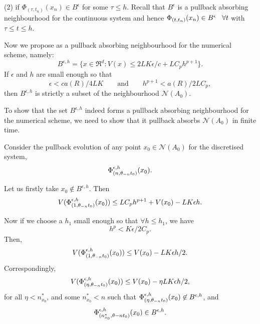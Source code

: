 \begin{prf}
  (2) if $\Phi_{(\tau,t_n)}(x_n) \in B^{\epsilon}$ for some $\tau
  \leq h$. Recall that $B^{\epsilon}$ is a pullback absorbing
  neighbourhood for the continuous system and hence $\Phi_{(t,t_{n})}(x_{n})
  \in B^{\epsilon} \hspace{3mm} \forall t$ with $\tau \leq t \leq h$.

  Now we propose as a pullback absorbing neighbourhood for the numerical
  scheme, namely:
  \[ B^{\epsilon,h} = \{x \in \Re^{d} : V(x) \leq 2LK \epsilon /c +
                    LC_{p}h^{p+1} \}. \]
  If $\epsilon$ and $h$ are small enough so that
  \begin{equation}\label{ehlimitseq}
    \epsilon < c a(R) / 4LK \qquad \text{and} \qquad  h^{p+1}  <  a(R) / 2LC_p,
  \end{equation}
  then $B^{\epsilon,h}$ is strictly a subset of the neighbourhood
  $\mathcal{N}(A_0)$.

  To show that the set $B^{\epsilon,h}$ indeed forms a pullback absorbing
  neighbourhood for the numerical scheme, we need to show that
  it pullback absorbs $\mathcal{N}(A_0)$ in finite time.

  Consider the pullback evolution of any point $x_{0} \in \mathcal{N}(A_0)$
  for the discretised system,
  \[ \Phi^{\epsilon,h}_{(n,\theta_{-n}t_0)}(x_0). \]

  Let us firstly take $x_{0} \not \in B^{\epsilon,h}$. Then
  \[ V(\Phi^{\epsilon,h}_{(1,\theta_{-n}t_0)}(x_0)) \leq LC_{p}h^{p+1} +  V(x_0) - LK
              \epsilon h. \]

  Now if we choose a $h_{1}$ small enough so that $\forall h \leq h_1$,
  we have
  \begin{equation}\label{hlimiteq}
  h^{p} < K\epsilon/2C_{p}.
  \end{equation}
  Then,
  \[ V(\Phi^{\epsilon,h}_{(1,\theta_{-n}t_0)}(x_0)) \leq V(x_0) - LK \epsilon h / 2.
\]   Correspondingly,
  \[ V(\Phi^{\epsilon,h}_{(\eta,\theta_{-n}t_0)}(x_0)) \leq V(x_0) - \eta
                LK \epsilon h/2, \]
  for all $\eta < n^*_{x_0}$, and some $n^*_{x_0} < n$ such that
  $\Phi^{\epsilon,h}_{(\eta,\theta_{-n}t_0)}(x_0) \not \in B^{\epsilon,h}$, and
  \begin{equation}\label{dispulleq}
    \Phi^{\epsilon,h}_{(n^*_{x_0},\theta{-n}t_0)}(x_0) \in B^{\epsilon,h}.
  \end{equation}


\end{prf}
